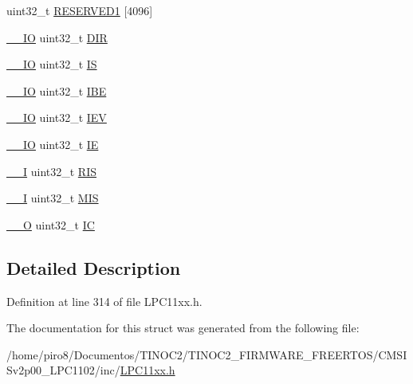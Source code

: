 \begin{DoxyCompactItemize}
\begin{tabbing}
\end{tabbing}\item 
uint32\+\_\+t \hyperlink{group___l_p_c11xx___definitions_ga0c03729e6952253d21fc84623affecc8}{R\+E\+S\+E\+R\+V\+E\+D1} \mbox{[}4096\mbox{]}
\item 
\hyperlink{group___c_m_s_i_s__core__definitions_gaec43007d9998a0a0e01faede4133d6be}{\+\_\+\+\_\+\+IO} uint32\+\_\+t \hyperlink{group___l_p_c11xx___definitions_ga39dad13799c53cc50122d3b504f1f215}{D\+IR}
\item 
\hyperlink{group___c_m_s_i_s__core__definitions_gaec43007d9998a0a0e01faede4133d6be}{\+\_\+\+\_\+\+IO} uint32\+\_\+t \hyperlink{group___l_p_c11xx___definitions_gaa61b4d1fa9ec8608bc0d34e094e9a605}{IS}
\item 
\hyperlink{group___c_m_s_i_s__core__definitions_gaec43007d9998a0a0e01faede4133d6be}{\+\_\+\+\_\+\+IO} uint32\+\_\+t \hyperlink{group___l_p_c11xx___definitions_gad60ed0e9e99e717d85add279d88cff1d}{I\+BE}
\item 
\hyperlink{group___c_m_s_i_s__core__definitions_gaec43007d9998a0a0e01faede4133d6be}{\+\_\+\+\_\+\+IO} uint32\+\_\+t \hyperlink{group___l_p_c11xx___definitions_ga6e9fc83dd2bca12c307e35a48963f507}{I\+EV}
\item 
\hyperlink{group___c_m_s_i_s__core__definitions_gaec43007d9998a0a0e01faede4133d6be}{\+\_\+\+\_\+\+IO} uint32\+\_\+t \hyperlink{group___l_p_c11xx___definitions_gac02a984a4f5ce3e5851cc7ea9fa23527}{IE}
\item 
\hyperlink{group___c_m_s_i_s__core__definitions_gaf63697ed9952cc71e1225efe205f6cd3}{\+\_\+\+\_\+I} uint32\+\_\+t \hyperlink{group___l_p_c11xx___definitions_ga804c5ae638accaaaff4d1d044e788b55}{R\+IS}
\item 
\hyperlink{group___c_m_s_i_s__core__definitions_gaf63697ed9952cc71e1225efe205f6cd3}{\+\_\+\+\_\+I} uint32\+\_\+t \hyperlink{group___l_p_c11xx___definitions_gaa611e60a60c7477a9b5eb5b101d8f2be}{M\+IS}
\item 
\hyperlink{group___c_m_s_i_s__core__definitions_ga7e25d9380f9ef903923964322e71f2f6}{\+\_\+\+\_\+O} uint32\+\_\+t \hyperlink{group___l_p_c11xx___definitions_ga68ef5e6a1ea080bada52390c13d4c650}{IC}
\end{DoxyCompactItemize}


\subsection{Detailed Description}


Definition at line 314 of file L\+P\+C11xx.\+h.



The documentation for this struct was generated from the following file\+:\begin{DoxyCompactItemize}
\item 
/home/piro8/\+Documentos/\+T\+I\+N\+O\+C2/\+T\+I\+N\+O\+C2\+\_\+\+F\+I\+R\+M\+W\+A\+R\+E\+\_\+\+F\+R\+E\+E\+R\+T\+O\+S/\+C\+M\+S\+I\+Sv2p00\+\_\+\+L\+P\+C1102/inc/\hyperlink{_l_p_c11xx_8h}{L\+P\+C11xx.\+h}\end{DoxyCompactItemize}
